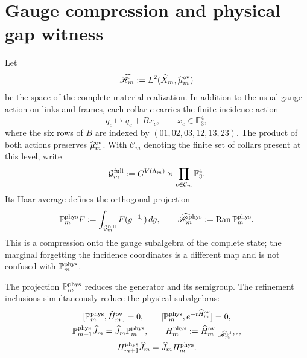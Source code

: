 \section*{Gauge compression and physical gap witness}

Let
\[
 \widehat{\mathscr H}_m
 :=L^2(\widehat X_m,\widehat\mu_m^{\rm ov})
\]
be the space of the complete material realization. In addition to the usual gauge
action on links and frames, each collar \(c\) carries the finite incidence
action
\begin{equation}\label{eq:amp-ym-accion-gauge-incidencia}
 q_c\longmapsto q_c+Bx_c,
 \qquad x_c\in\mathbb F_3^4,
\end{equation}
where the six rows of \(B\) are indexed by
\((01,02,03,12,13,23)\). The product of both actions preserves
\(\widehat\mu_m^{\rm ov}\). With \(\mathcal C_m\) denoting the finite set of
collars present at this level, write
\[
 \mathcal G_m^{\rm full}
 :=G^{V(\Lambda_m)}
   \times\prod_{c\in\mathcal C_m}\mathbb F_3^4.
\]
Its Haar average defines the orthogonal
projection
\begin{equation}\label{eq:amp-ym-proyeccion-fisica-haar}
 \mathbb P_m^{\rm phys}F
 :=\int_{\mathcal G_m^{\rm full}}F(g^{-1}\!\cdot\,)\,dg,
 \qquad
 \widehat{\mathscr H}_m^{\rm phys}
 :=\operatorname{Ran}\mathbb P_m^{\rm phys}.
\end{equation}
This is a compression onto the gauge subalgebra of the complete state; the
marginal forgetting the incidence coordinates is a different map and is not
confused with \(\mathbb P_m^{\rm phys}\).

\begin{lemma}
\label{lem:amp-ym-compresion-fisica}
The projection \(\mathbb P_m^{\rm phys}\) reduces the generator and its
semigroup. The refinement inclusions simultaneously reduce the
physical subalgebras:
\begin{equation}\label{eq:amp-ym-compresion-entrelazada}
 \begin{gathered}
 [\mathbb P_m^{\rm phys},\widehat H_m^{\rm ov}]=0,
 \qquad
 [\mathbb P_m^{\rm phys},e^{-t\widehat H_m^{\rm ov}}]=0,\\
 \mathbb P_{m+1}^{\rm phys}\widehat J_m
 =\widehat J_m\mathbb P_m^{\rm phys},\qquad
 H_m^{\rm phys}
 :=\widehat H_m^{\rm ov}\big|_{\widehat{\mathscr H}_m^{\rm phys}},\\
 H_{m+1}^{\rm phys}\widehat J_m
 =\widehat J_mH_m^{\rm phys}.
 \end{gathered}
\end{equation}
\end{lemma}

